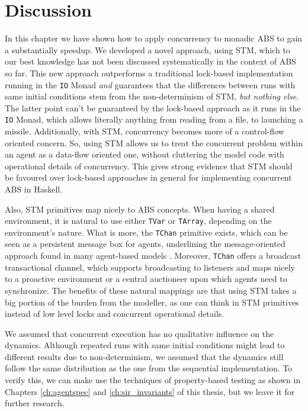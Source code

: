 \section{Discussion}
In this chapter we have shown how to apply concurrency to monadic ABS to gain a substantially speedup. We developed a novel approach, using STM, which to our best knowledge has not been discussed systematically in the context of ABS so far. This new approach outperforms a traditional lock-based implementation running in the \texttt{IO} Monad \textit{and} guarantees that the differences between runs with same initial conditions stem from the non-determinism of STM, \textit{but nothing else}. The latter point can't be guaranteed by the lock-based approach as it runs in the \texttt{IO} Monad, which allows literally anything from reading from a file, to launching a missile. Additionally, with STM, concurrency becomes more of a control-flow oriented concern. So, using STM allows us to treat the concurrent problem within an agent as a data-flow oriented one, without cluttering the model code with operational details of concurrency. This gives strong evidence that STM should be favoured over lock-based approaches in general for implementing concurrent ABS in Haskell.

Also, STM primitives map nicely to ABS concepts. When having a shared environment, it is natural to use either \texttt{TVar} or \texttt{TArray}, depending on the environment's nature. What is more, the \texttt{TChan} primitive exists, which can be seen as a persistent message box for agents, underlining the message-oriented approach found in many agent-based models \cite{agha_actors:_1986, wooldridge_introduction_2009}. Moreover, \texttt{TChan} offers a broadcast transactional channel, which supports broadcasting to listeners and maps nicely to a proactive environment or a central auctioneer upon which agents need to synchronize. The benefits of these natural mappings are that using STM takes a big portion of the burden from the modeller, as one can think in STM primitives instead of low level locks and concurrent operational details. 

We assumed that concurrent execution has no qualitative influence on the dynamics. Although repeated runs with same initial conditions might lead to different results due to non-determinism, we assumed that the dynamics still follow the same distribution as the one from the sequential implementation. To verify this, we can make use the techniques of property-based testing as shown in Chapters \ref{ch:agentspec} and \ref{ch:sir_invariants} of this thesis, but we leave it for further research.

